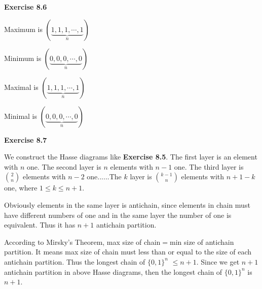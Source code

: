 \documentclass{article} %
\begin{document}
	\textbf{Exercise 8.6}\par
	Maximum is $(\underbrace{1,1,1,\cdots,1}_{n})$\par
	Minimum is $(\underbrace{0,0,0,\cdots,0}_{n})$\par
	Maximal is  $(\underbrace{1,1,1,\cdots,1}_{n})$\par
	Minimal is $(\underbrace{0,0,0,\cdots,0}_{n})$\par
	\textbf{Exercise 8.7}\par
	We construct the Hasse diagrams like \textbf{Exercise 8.5}. 
	The first layer is an element with $n$ one. The second layer is $n$ elements with $n-1$ one.
	The third layer is $\binom{2}{n}$ elements with $n-2$ one......The $k$ layer is $\binom{k-1}{n}$ elements with $n+1-k$ one, where $1\leq k\leq n+1$.\par
	Obviously elements in the same layer is antichain, since elements in chain must have different numbers of one and in the same layer the number of one is equivalent.
	Thus it has $n+1$ antichain partition.\par
	According to Mirsky's Theorem, max size of chain$=$min size of antichain partition. It means max size of chain must less than or equal to the size of each antichain partition. 
	Thus the longest chain of ${\{0,1\}}^n$ $\leq n+1$. Since we get $n+1$ antichain partition in above Hasse diagrams, then the longest chain of ${\{0,1\}}^n$ is $n+1$.\par 
	

	
\end{document}
